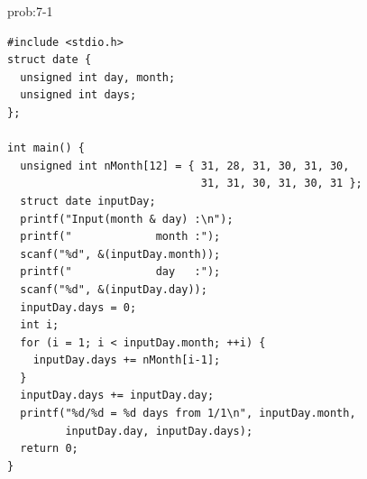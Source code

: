 %
\begin{renshuu-answer}{prob:7-1}
\baselineskip=12pt
\begin{verbatim}
#include <stdio.h>
struct date {
  unsigned int day, month;
  unsigned int days;
};

int main() {
  unsigned int nMonth[12] = { 31, 28, 31, 30, 31, 30,
                              31, 31, 30, 31, 30, 31 };
  struct date inputDay;
  printf("Input(month & day) :\n");
  printf("             month :");
  scanf("%d", &(inputDay.month));
  printf("             day   :");
  scanf("%d", &(inputDay.day));
  inputDay.days = 0;
  int i;
  for (i = 1; i < inputDay.month; ++i) {
    inputDay.days += nMonth[i-1];
  }
  inputDay.days += inputDay.day;
  printf("%d/%d = %d days from 1/1\n", inputDay.month,
         inputDay.day, inputDay.days);
  return 0;
}
\end{verbatim}
\end{renshuu-answer}
%
